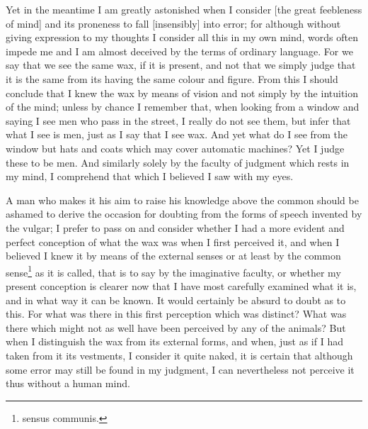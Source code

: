 Yet in the meantime I am greatly astonished when I consider [the great
feebleness of mind] and its proneness to fall [insensibly] into error;
for although without giving expression to my thoughts I consider all
this in my own mind, words often impede me and I am almost deceived by
the terms of ordinary language. For we say that we see the same wax,
if it is present, and not that we simply judge that it is the same
from its having the same colour and figure. From this I should
conclude that I knew the wax by means of vision and not simply by the
intuition of the mind; unless by chance I remember that, when looking
from a window and saying I see men who pass in the street, I really do
not see them, but infer that what I see is men, just as I say that I
see wax. And yet what do I see from the window but hats and coats
which may cover automatic machines? Yet I judge these to be men. And
similarly  solely by the faculty of judgment which rests in
my mind, I comprehend that which I believed I saw with my eyes.

A man who makes it his aim to raise his knowledge above the common
should be ashamed to derive the occasion for doubting from the forms
of speech invented by the vulgar; I prefer to pass on and consider
whether I had a more evident and perfect conception of what the wax
was when I first perceived it, and when I believed I knew it by means
of the external senses or at least by the common sense\footnote{sensus
communis.} as it is called, that is to say by the imaginative faculty,
or whether my present conception is clearer now that I have most
carefully examined what it is, and in what way it can be known. It
would certainly be absurd to doubt as to this. For what was there in
this first perception which was distinct? What was there which might
not as well have been perceived by any of the animals? But when I
distinguish the wax from its external forms, and when, just as if I
had taken from it its vestments, I consider it quite naked, it is
certain that although some error may still be found in my judgment, I
can nevertheless not perceive it thus without a human mind.

